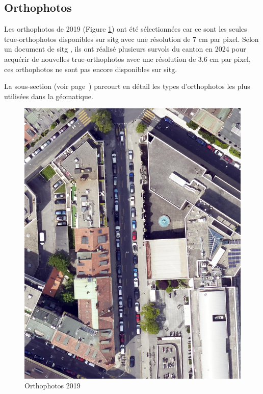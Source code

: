 \subsection{Orthophotos}
Les orthophotos de 2019 (Figure \ref{fig:ch3_dataset_methodo_01_orthophoto_2019}) ont été sélectionnées car ce sont les seules true-orthophotos disponibles sur \acrshort{sitg} avec une résolution de 7 \si{\unit{cm}} par pixel. Selon un document de \acrshort{sitg} \cite{etat_de_geneve_inventaire_2025}, ils ont réalisé plusieurs survols du canton en 2024 pour acquérir de nouvelles true-orthophotos avec une résolution de 3.6 \si{\unit{cm}} par pixel, ces orthophotos ne sont pas encore disponibles sur \acrshort{sitg}.

La sous-section \textit{} (voir page~\pageref{subsec:annexe_ortophotos}) parcourt en détail les types d'orthophotos les plus utilisées dans la géomatique.

\begin{figure}[H]
    \centering
    \includegraphics[width=1\linewidth]{02-main//figures/ch3/ch3_dataset_methodo_01_orthophoto_2019.png}
    \caption{Orthophotos 2019}
    \label{fig:ch3_dataset_methodo_01_orthophoto_2019}
\end{figure}


